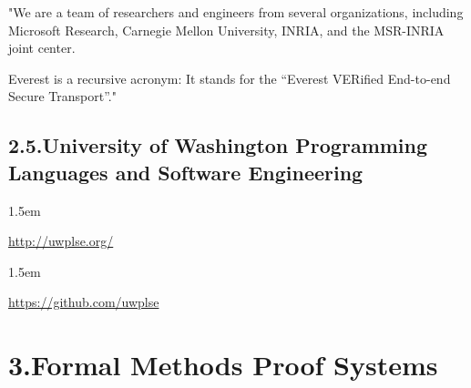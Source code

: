 \documentclass[12pt,twoside]{article}
\begin{document}
\noindent{}"We are a team of researchers and engineers from several
organizations, including Microsoft Research, Carnegie Mellon
University, INRIA, and the MSR-INRIA joint center.%

Everest is a recursive acronym: It stands for the “Everest VERified
End-to-end Secure Transport”."%

\subsection{2.5.\hspace*{0.5em}University of Washington Programming Languages and Software Engineering}%

\begin{mddefinitions}%


\begin{mdbmarginx}{}{}{}{1.5em}%
\begin{mddefdata}%
\href{http://uwplse.org/}{{\ttfamily http://\hspace{0pt}uwplse.\hspace{0pt}org/\hspace{0pt}}}
\end{mddefdata}%
\end{mdbmarginx}%


\begin{mdbmarginx}{}{}{}{1.5em}%
\begin{mddefdata}%
\href{https://github.com/uwplse}{{\ttfamily https://\hspace{0pt}github.\hspace{0pt}com/\hspace{0pt}uwplse}}%
\end{mddefdata}%
\end{mdbmarginx}%
\end{mddefinitions}%

\section{3.\hspace*{0.5em}Formal Methods Proof Systems}%
\end{document}
